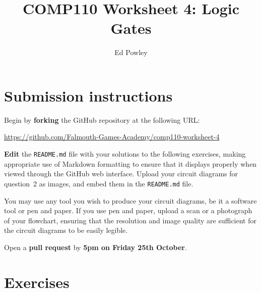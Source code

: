 \documentclass{../../../fal_assignment}
\title{COMP110 Worksheet 4: Logic Gates}
\author{Ed Powley}
\begin{document}
\maketitle

\section*{Submission instructions}

Begin by \textbf{forking} the GitHub repository at the following URL:

\url{https://github.com/Falmouth-Games-Academy/comp110-worksheet-4}

\textbf{Edit} the \texttt{README.md} file with your solutions to the following exercises,
making appropriate use of Markdown formatting to ensure that it displays properly when viewed through the GitHub web interface.
Upload your circuit diagrams for question~2 as images, and embed them in the \texttt{README.md} file.

You may use any tool you wish to produce your circuit diagrams,
be it a software tool or pen and paper.
If you use pen and paper, upload a scan or a photograph of your flowchart,
ensuring that the resolution and image quality are sufficient for the circuit diagrams to be easily legible.

Open a \textbf{pull request} by \textbf{5pm on Friday 25th October}.

\section*{Exercises}
\end{document}
